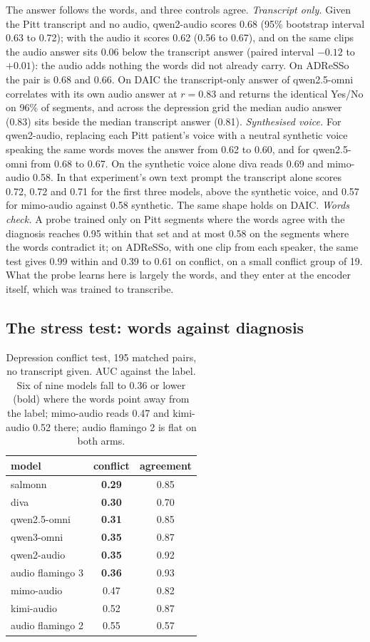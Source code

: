 \documentclass{article}
\begin{document}
The answer follows the words, and three controls agree. \emph{Transcript only.} Given the Pitt transcript and no audio, qwen2-audio
scores 0.68 (95\% bootstrap interval 0.63 to 0.72); with the audio it scores 0.62 (0.56 to 0.67),
and on the same clips the audio answer sits 0.06 below the transcript answer (paired interval $-0.12$
to $+0.01$): the audio adds nothing the words did not already carry. On ADReSSo the pair is 0.68 and
0.66. On DAIC the transcript-only answer of qwen2.5-omni correlates with its own audio answer at
$r = 0.83$ and returns the identical Yes/No on 96\% of segments, and across the depression grid the
median audio answer (0.83) sits beside the median transcript answer (0.81). \emph{Synthesised voice.} For qwen2-audio, replacing each Pitt patient's voice with a neutral
synthetic voice speaking the same words moves the answer from 0.62 to 0.60, and for qwen2.5-omni
from 0.68 to 0.67. On the synthetic voice alone diva reads 0.69 and mimo-audio 0.58. In that
experiment's own text prompt the transcript alone scores 0.72, 0.72 and 0.71 for the first three
models, above the synthetic voice, and 0.57 for mimo-audio against 0.58 synthetic. The same shape holds on DAIC. \emph{Words check.} A
probe trained only on Pitt segments where the words agree with the diagnosis reaches 0.95 within that
set and at most 0.58 on the segments where the words contradict it; on ADReSSo, with one clip from each speaker,
the same test gives 0.99 within and 0.39 to 0.61 on conflict, on a small conflict group of 19. What the probe learns here is largely the words, and they enter at the encoder itself, which was
trained to transcribe.

\subsection{The stress test: words against diagnosis}

\begin{table}[t]
\centering\footnotesize
\caption{Depression conflict test, 195 matched pairs, no transcript given. AUC against the
label. Six of nine models fall to 0.36 or lower (bold) where the words point away from the label;
mimo-audio reads 0.47 and kimi-audio 0.52 there; audio flamingo 2 is flat on both arms.}
\label{tab:conflict}
\begin{tabular}{@{}lcc@{}}
\toprule
model & conflict & agreement \\
\midrule
salmonn            & \textbf{0.29} & 0.85 \\
diva               & \textbf{0.30} & 0.70 \\
qwen2.5-omni       & \textbf{0.31} & 0.85 \\
qwen3-omni         & \textbf{0.35} & 0.87 \\
qwen2-audio        & \textbf{0.35} & 0.92 \\
audio flamingo 3   & \textbf{0.36} & 0.93 \\
mimo-audio         & 0.47 & 0.82 \\
kimi-audio         & 0.52 & 0.87 \\
audio flamingo 2   & 0.55 & 0.57 \\
\bottomrule
\end{tabular}
\end{table}
\end{document}
